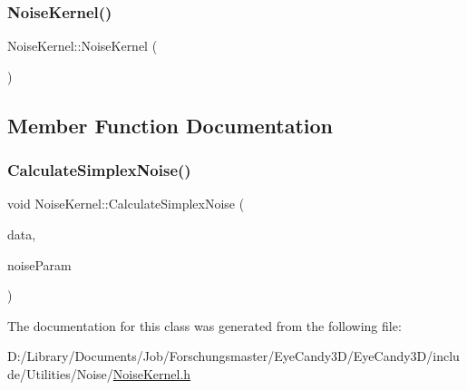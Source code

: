 \subsubsection{\texorpdfstring{Noise\+Kernel()}{NoiseKernel()}}
{\footnotesize\ttfamily Noise\+Kernel\+::\+Noise\+Kernel (\begin{DoxyParamCaption}{ }\end{DoxyParamCaption})}



\subsection{Member Function Documentation}
\mbox{\label{class_noise_kernel_a644b4289ce93b14b98734b904c4df62a}} 
\subsubsection{\texorpdfstring{Calculate\+Simplex\+Noise()}{CalculateSimplexNoise()}}
{\footnotesize\ttfamily void Noise\+Kernel\+::\+Calculate\+Simplex\+Noise (\begin{DoxyParamCaption}\item[{std\+::vector$<$ std\+::vector$<$ float $>$$>$ \&}]{data,  }\item[{const \mbox{\hyperlink{structutl_1_1_noise_parameter}{utl\+::\+Noise\+Parameter}} \&}]{noise\+Param }\end{DoxyParamCaption})}



The documentation for this class was generated from the following file\+:\begin{DoxyCompactItemize}
\item 
D\+:/\+Library/\+Documents/\+Job/\+Forschungsmaster/\+Eye\+Candy3\+D/\+Eye\+Candy3\+D/include/\+Utilities/\+Noise/\mbox{\hyperlink{_noise_kernel_8h}{Noise\+Kernel.\+h}}\end{DoxyCompactItemize}
